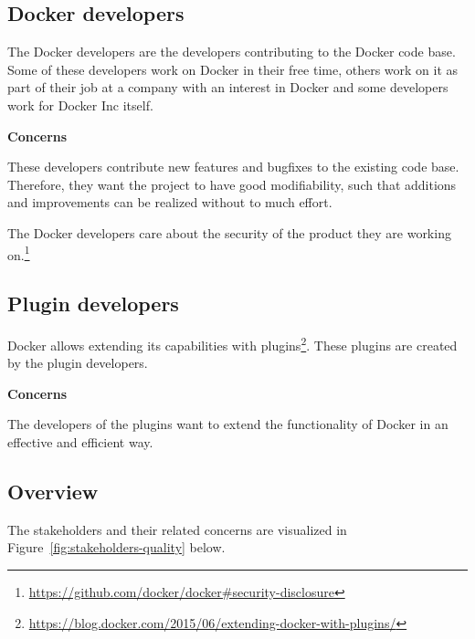 \subsection*{Docker developers}
The Docker developers are the developers contributing to the Docker code base. Some of these developers work on Docker in their free time, others work on it as part of their job at a company with an interest in Docker and some developers work for Docker Inc itself\cite{whoaredockerdevs}.

\textbf{Concerns}
\begin{description}[labelindent=25pt,style=multiline,leftmargin=4.0cm,font=\normalfont\itshape]

\item[\textbf{Maintainability} \textit{(Modifiability)}] These developers contribute new features and bugfixes to the existing code base. Therefore, they want the project to have good modifiability, such that additions and improvements can be realized without to much effort.

\item[\textbf{Security}] The Docker developers care about the security of the product they are working on.\footnote{\url{https://github.com/docker/docker\#security-disclosure}}  %


\end{description}

\subsection*{Plugin developers}
Docker allows extending its capabilities with plugins\footnote{\url{https://blog.docker.com/2015/06/extending-docker-with-plugins/}}. These plugins are created by the plugin developers.

\textbf{Concerns}
\begin{description}[labelindent=25pt,style=multiline,leftmargin=4.0cm,font=\normalfont\itshape]

\item[\textbf{Portability} (Adaptability)] The developers of the plugins want to extend the functionality of Docker in an effective and efficient way. 

\end{description}

\subsection*{Overview}
The stakeholders and their related concerns are visualized in Figure~\ref{fig:stakeholders-quality} below.

